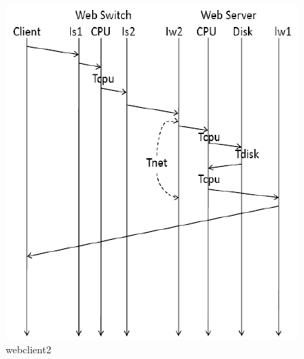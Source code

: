 \begin{figure}[H]
\begin{center}
\includegraphics[scale=0.5]{etc/webclient2.png}
\caption{webclient2}
\label{webclient2}
\end{center}
\end{figure}

